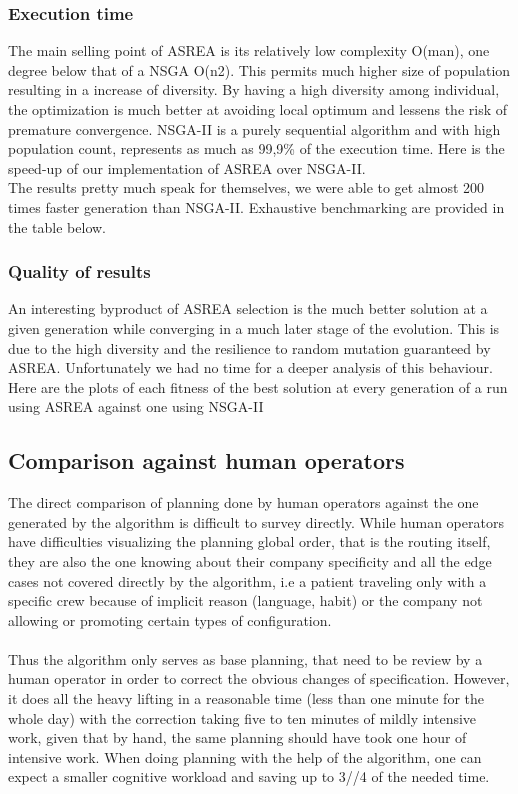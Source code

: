 \documentclass[12pt]{memoir}
\begin{document}
\subsubsection{Execution time}
The main selling point of ASREA is its relatively low complexity O(man), one degree below that of a NSGA O(n2).
This permits much higher size of population resulting in a increase of diversity. By having a high diversity
among individual, the optimization is much better at avoiding local optimum and lessens the risk of premature
convergence. NSGA-II is a purely sequential algorithm and with high population count, represents as much as
99,9\% of the execution time. Here is the speed-up of our implementation of ASREA over NSGA-II. \\
The results pretty much speak for themselves, we were able to get almost 200 times faster generation
than NSGA-II. Exhaustive benchmarking are provided in the table below.
 
\subsubsection{Quality of results}
An interesting byproduct of ASREA selection is the much better solution at a given generation while converging
in a much later stage of the evolution. This is due to the high diversity and the resilience to random mutation
guaranteed by ASREA. Unfortunately we had no time for a deeper analysis of this behaviour. Here are the plots of
each fitness of the best solution at every generation of a run using ASREA against one using NSGA-II

\subsection{Comparison against human operators}
The direct comparison of planning done by human operators against the one generated by the algorithm is difficult
to survey directly. While human operators have difficulties visualizing the planning global order, that is the routing
itself, they are also the one knowing about their company specificity and all the edge cases not covered directly by
the algorithm, i.e a patient traveling only with a specific crew because of implicit reason (language, habit) or the company
not allowing or promoting certain types of configuration.\\
\\
Thus the algorithm only serves as base planning, that need to be review by a human operator in order to correct
the obvious changes of specification. However, it does all the heavy lifting in a reasonable time (less than one minute
for the whole day) with the correction taking five to ten minutes of mildly intensive work, given that by hand, the same planning
should have took one hour of intensive work. When doing planning with the help of the algorithm, one can expect a smaller
cognitive workload and saving up to 3//4 of the needed time.  
\end{document}
